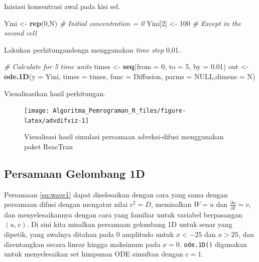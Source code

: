 \documentclass[
]{book}
\newenvironment{Shaded}{\begin{snugshade}}{\end{snugshade}}
\newcommand{\AttributeTok}[1]{\textcolor[rgb]{0.13,0.29,0.53}{#1}}
\newcommand{\CommentTok}[1]{\textcolor[rgb]{0.56,0.35,0.01}{\textit{#1}}}
\newcommand{\ConstantTok}[1]{\textcolor[rgb]{0.56,0.35,0.01}{#1}}
\newcommand{\DecValTok}[1]{\textcolor[rgb]{0.00,0.00,0.81}{#1}}
\newcommand{\FloatTok}[1]{\textcolor[rgb]{0.00,0.00,0.81}{#1}}
\newcommand{\FunctionTok}[1]{\textcolor[rgb]{0.13,0.29,0.53}{\textbf{#1}}}
\newcommand{\NormalTok}[1]{#1}
\newcommand{\OtherTok}[1]{\textcolor[rgb]{0.56,0.35,0.01}{#1}}
\theoremstyle{definition}
\theoremstyle{definition}
\theoremstyle{definition}
\theoremstyle{definition}
\theoremstyle{remark}
\begin{document}
Inisiasi konsentrasi awal pada kisi sel.

\begin{Shaded}
\begin{Highlighting}[]
\NormalTok{Yini }\OtherTok{\textless{}{-}} \FunctionTok{rep}\NormalTok{(}\DecValTok{0}\NormalTok{,N) }\CommentTok{\# Initial concentration = 0}
\NormalTok{Yini[}\DecValTok{2}\NormalTok{] }\OtherTok{\textless{}{-}} \DecValTok{100}   \CommentTok{\# Except in the second cell}
\end{Highlighting}
\end{Shaded}

Lakukan perhitungandengn menggunakan \emph{time step} 0,01.

\begin{Shaded}
\begin{Highlighting}[]
\CommentTok{\# Calculate for 5 time units}
\NormalTok{times }\OtherTok{\textless{}{-}} \FunctionTok{seq}\NormalTok{(}\AttributeTok{from =} \DecValTok{0}\NormalTok{, }\AttributeTok{to =} \DecValTok{5}\NormalTok{, }\AttributeTok{by =} \FloatTok{0.01}\NormalTok{)}
\NormalTok{out }\OtherTok{\textless{}{-}} \FunctionTok{ode.1D}\NormalTok{(}\AttributeTok{y =}\NormalTok{ Yini, }\AttributeTok{times =}\NormalTok{ times, }\AttributeTok{func =}\NormalTok{ Diffusion,}
             \AttributeTok{parms =} \ConstantTok{NULL}\NormalTok{,}\AttributeTok{dimens =}\NormalTok{ N)}
\end{Highlighting}
\end{Shaded}

Visualisasikan hasil perhitungan.

\begin{figure}

{\centering \texttt{[image: Algoritma\_Pemrograman\_R\_files/figure-latex/advdifviz-1]} 

}

\caption{Visualisasi hasil simulasi persamaan adveksi-difusi menggunakan paket ReacTran}\label{fig:advdifviz}
\end{figure}

\hypertarget{persamaan-gelombang-1d}{%
\subsection{Persamaan Gelombang 1D}\label{persamaan-gelombang-1d}}

Persamaan \eqref{eq:wave1} dapat diselesaikan dengan cara yang sama dengan persamaan difusi dengan mengatur nilai \(c^2=D\), memisalkan \(W=u\) dan \(\frac{\partial u}{\partial t}=v\), dan menyelesaikannya dengan cara yang familiar untuk variabel berpasangan \(\left(u,v\right)\). Di sini kita misalkan persamaan gelombang 1D untuk senar yang dipetik, yang awalnya ditahan pada \(0\) amplitudo untuk \(x <−25\) dan \(x> 25\), dan direntangkan secara linear hingga maksimum pada \(x = 0\). \texttt{ode.1D()} digunakan untuk menyelesaikan set himpunan ODE simultan dengan \(c = 1\).
\end{document}

